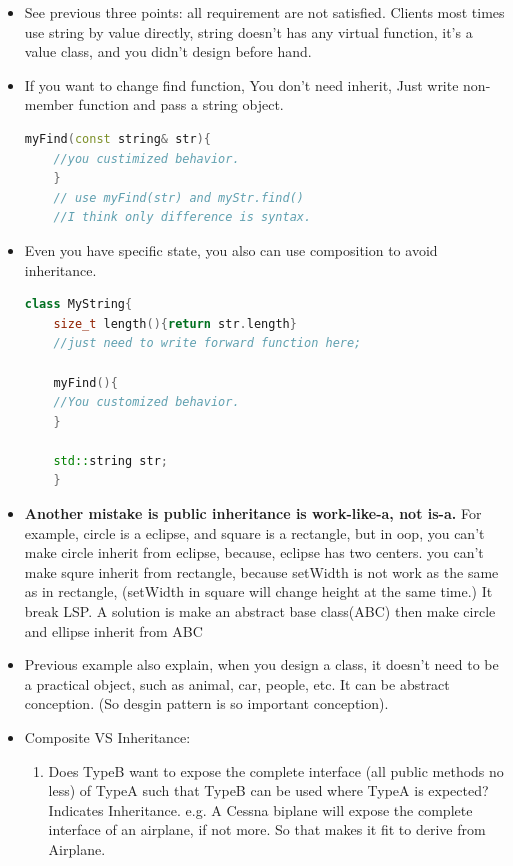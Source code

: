 \documentclass[a4paper,12pt,twoside]{book}
\begin{document}
\begin{itemize}
	\item See previous three points: all requirement are not satisfied. Clients most times use string by value directly, string doesn't has any virtual function, it's a value class, and you didn't design before hand.
	
	\item If you want to change find function, You don't need inherit,  Just write non-member function and pass a string object.
	\begin{lstlisting}[frame=single, language=c++]
	myFind(const string& str){
	//you custimized behavior.
	}
	// use myFind(str) and myStr.find()
	//I think only difference is syntax.
	\end{lstlisting}
	
	\item Even you have specific state, you also can use composition to avoid inheritance.
	\begin{lstlisting}[frame=single, language=c++]
	class MyString{
	size_t length(){return str.length}
	//just need to write forward function here;
	
	myFind(){
	//You customized behavior.
	}
	
	std::string str;
	}
	\end{lstlisting}
	
	
	\item \textbf{Another mistake is public inheritance is work-like-a, not is-a.} For example, circle is a eclipse, and square is a rectangle, but in oop, you can't make circle inherit from eclipse, because, eclipse has two centers.  you can't make squre inherit from rectangle, because setWidth is not work as the same as in rectangle, (setWidth in square will change height at the same time.) It break LSP.  A solution is make an abstract base class(ABC) then make circle and ellipse inherit from ABC
	
	
	\item Previous example also explain, when you design a class, it doesn't need to be a practical object, such as animal, car, people, etc.  It can be abstract conception.  (So desgin pattern is so important conception).
	
	\item Composite VS Inheritance:
	\begin{enumerate}
		\item Does TypeB want to expose the complete interface (all public methods no less) of TypeA such that TypeB can be used where TypeA is expected? Indicates Inheritance. e.g. A Cessna biplane will expose the complete interface of an airplane, if not more. So that makes it fit to derive from Airplane.
		

\end{enumerate}
\end{itemize}
\end{document}
